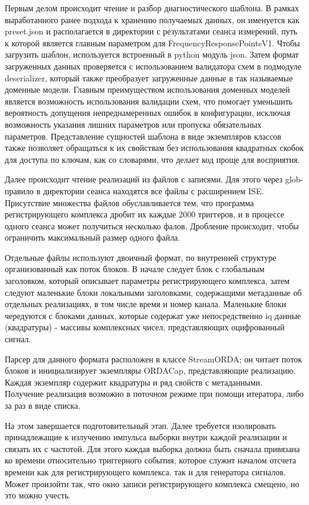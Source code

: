 \documentclass{report}
\begin{document}
Первым делом происходит чтение и разбор диагностического шаблона. В рамках выработанного ранее подхода к хранению получаемых данных, он именуется как preset.json и располагается в директории с результатами сеанса измерений, путь к которой является главным параметром для FrequencyResponsePointsV1. Чтобы загрузить шаблон, используется встроенный в python модуль json. Затем формат загруженных данных проверяется с использованием валидатора схем в подмодуле deserializer, который также преобразует загруженные данные в так называемые доменные модели. Главным преимуществом использования доменных моделей является возможность использования валидации схем, что помогает уменьшить вероятность допущения непреднамеренных ошибок в конфигурации, исключая возможность указания лишних параметров или пропуска обязательных параметров. Представление сущностей шаблона в виде экземпляров классов также позволяет обращаться к их свойствам без использования квадратных скобок для доступа по ключам, как со словарями, что делает код проще для восприятия.

Далее происходит чтение реализаций из файлов с записями. Для этого через glob-правило в директории сеанса находятся все файлы с расширением ISE. Присутствие множества файлов обуславливается тем, что программа регистрирующего комплекса дробит их каждые 2000 триггеров, и в процессе одного сеанса может получиться несколько фалов. Дробление происходит, чтобы ограничить максимальный размер одного файла.

Отдельные файлы используют двоичный формат, по внутренней структуре организованный как поток блоков. В начале следует блок с глобальным заголовком, который описывает параметры регистрирующего комплекса, затем следуют маленькие блоки локальными заголовками, содержащими метаданные об отдельных реализациях, в том числе время и номер канала. Маленькие блоки чередуются с блоками данных, которые содержат уже непосредственно iq данные (квадратуры) - массивы комплексных чисел, представляющих оцифрованный сигнал.

Парсер для данного формата расположен в классе StreamORDA; он читает поток блоков и инициализирует экземпляры ORDACap, представляющие реализацию. Каждая экземпляр содержит квадратуры и ряд свойств с метаданными. Получение реализация возможно в поточном режиме при помощи итератора, либо за раз в виде списка.

На этом завершается подготовительный этап. Далее требуется изолировать принадлежащие к излучению импульса выборки внутри каждой реализации и связать их с частотой. Для этого каждая выборка должна быть сначала привязана ко времени относительно триггерного события, которое служит началом отсчета времени как для регистрирующего комплекса, так и для генератора сигналов. Может произойти так, что окно записи регистрирующего комплекса смещено, но это можно учесть.
\end{document}
